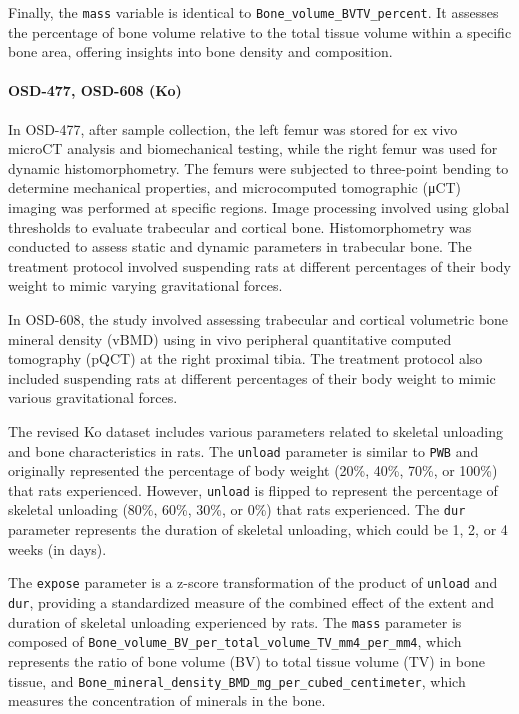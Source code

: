 \documentclass{article}
\begin{document}
Finally, the \texttt{mass} variable is identical to \texttt{Bone\_volume\_BVTV\_percent}. It assesses the percentage of bone volume relative to the total tissue volume within a specific bone area, offering insights into bone density and composition.

\paragraph{OSD-477, OSD-608 (Ko)}

In OSD-477, after sample collection, the left femur was stored for ex vivo microCT analysis and biomechanical testing, while the right femur was used for dynamic histomorphometry. The femurs were subjected to three-point bending to determine mechanical properties, and microcomputed tomographic (μCT) imaging was performed at specific regions. Image processing involved using global thresholds to evaluate trabecular and cortical bone. Histomorphometry was conducted to assess static and dynamic parameters in trabecular bone. The treatment protocol involved suspending rats at different percentages of their body weight to mimic varying gravitational forces.

In OSD-608, the study involved assessing trabecular and cortical volumetric bone mineral density (vBMD) using in vivo peripheral quantitative computed tomography (pQCT) at the right proximal tibia. The treatment protocol also included suspending rats at different percentages of their body weight to mimic various gravitational forces.

The revised Ko dataset includes various parameters related to skeletal unloading and bone characteristics in rats. The \texttt{unload} parameter is similar to \texttt{PWB} and originally represented the percentage of body weight (20\%, 40\%, 70\%, or 100\%) that rats experienced. However, \texttt{unload} is flipped to represent the percentage of skeletal unloading (80\%, 60\%, 30\%, or 0\%) that rats experienced. The \texttt{dur} parameter represents the duration of skeletal unloading, which could be 1, 2, or 4 weeks (in days).

The \texttt{expose} parameter is a z-score transformation of the product of \texttt{unload} and \texttt{dur}, providing a standardized measure of the combined effect of the extent and duration of skeletal unloading experienced by rats. The \texttt{mass} parameter is composed of \texttt{Bone\_volume\_BV\_per\_total\_volume\_TV\_mm4\_per\_mm4}, which represents the ratio of bone volume (BV) to total tissue volume (TV) in bone tissue, and \texttt{Bone\_mineral\_density\_BMD\_mg\_per\_cubed\_centimeter}, which measures the concentration of minerals in the bone.
\end{document}
